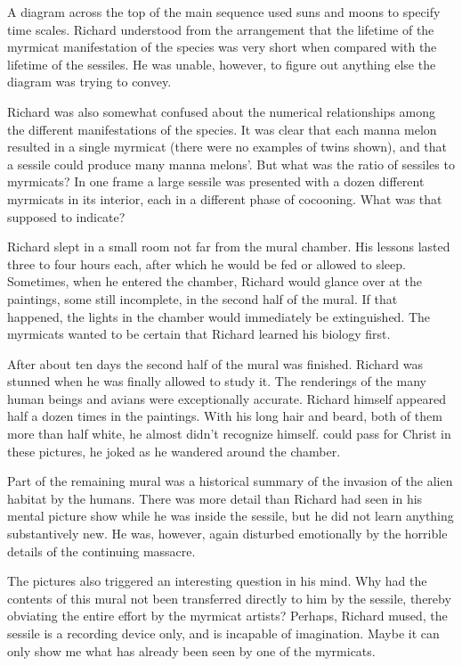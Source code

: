 \documentclass[]{article}
\begin{document}
{{A diagram across the top of the main sequence used suns and moons to specify time scales.  Richard understood from the arrangement that the lifetime of the myrmicat manifestation of the species was very short when compared with the lifetime of the sessiles.  He was unable, however, to figure out anything else the diagram was trying to convey.

Richard was also somewhat confused about the numerical relationships among the different manifestations of the species.  It was clear that each manna melon resulted in a single myrmicat (there were no examples of twins shown), and that a sessile could produce many manna melons’.  But what was the ratio of sessiles to myrmicats? In one frame a large sessile was presented with a dozen different myrmicats in its interior, each in a different phase of cocooning.  What was that supposed to indicate?

Richard slept in a small room not far from the mural chamber.  His lessons lasted three to four hours each, after which he would be fed or allowed to sleep.  Sometimes, when he entered the chamber, Richard would glance over at the paintings, some still incomplete, in the second half of the mural.  If that happened, the lights in the chamber would immediately be extinguished.  The myrmicats wanted to be certain that Richard learned his biology first.

After about ten days the second half of the mural was finished.  Richard was stunned when he was finally allowed to study it.  The renderings of the many human beings and avians were exceptionally accurate.  Richard himself appeared half a dozen times in the paintings.  With his long hair and beard, both of them more than half white, he almost didn’t recognize himself.  could pass for Christ in these pictures, he joked as he wandered around the chamber.

Part of the remaining mural was a historical summary of the invasion of the alien habitat by the humans.  There was more detail than Richard had seen in his mental picture show while he was inside the sessile, but he did not learn anything substantively new.  He was, however, again disturbed emotionally by the horrible details of the continuing massacre.

The pictures also triggered an interesting question in his mind.  Why had the contents of this mural not been transferred directly to him by the sessile, thereby obviating the entire effort by the myrmicat artists? Perhaps, Richard mused, the sessile is a recording device only, and is incapable of imagination.  Maybe it can only show me what has already been seen by one of the myrmicats.

}}
\end{document}
